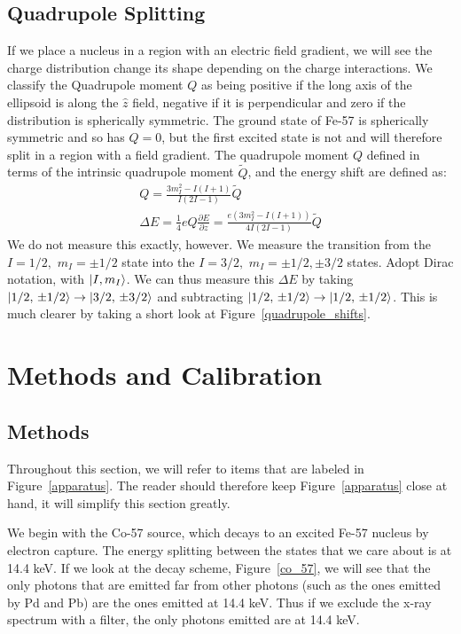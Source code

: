 \documentclass[reprint, nobibnotes, amssymb, amsmath, amsfonts, mathtools, mathrsfs, floatfix]{revtex4-1}
\begin{document}
      \subsection{Quadrupole Splitting}
        If we place a nucleus in a region with an electric field gradient, we will see the charge distribution change its shape depending on the charge interactions.  We classify the Quadrupole moment $Q$ as being positive if the long axis of the ellipsoid is along the $\hat{z}$ field, negative if it is perpendicular and zero if the distribution is spherically symmetric.  The ground state of Fe-57 is spherically symmetric and so has $Q = 0$, but the first excited state is not and will therefore split in a region with a field gradient.  The quadrupole moment $Q$ defined in terms of the intrinsic quadrupole moment $\tilde{Q}$, and the energy shift are defined as:
        \begin{gather}
          Q = \frac{3 m_I^2 - I(I+1)}{I(2I-1)}\tilde{Q} \label{quadrupole_moment} \\
          \Delta E = \frac{1}{4}eQ\frac{\partial E}{\partial z} = \frac{e\left(3 m_I^2 - I(I+1)\right)}{4I(2I-1)}\tilde{Q} \label{quadrupole_shift}
        \end{gather}
        We do not measure this exactly, however.  We measure the transition from the $I = 1/2,\,\, m_I = \pm1/2$ state into the $I = 3/2,\,\, m_I = \pm1/2, \pm3/2$ states.  Adopt Dirac notation, with $\ket{I, m_I}$.  We can thus measure this $\Delta E$ by taking $\ket{1/2,\,\pm1/2} \rightarrow \ket{3/2,\,\pm3/2}$ and subtracting $\ket{1/2,\,\pm1/2} \rightarrow \ket{1/2,\,\pm1/2}$.  This is much clearer by taking a short look at Figure~\ref{quadrupole_shifts}.

  \section{Methods and Calibration}
    \subsection{Methods}
      Throughout this section, we will refer to items that are labeled in Figure~\ref{apparatus}.  The reader should therefore keep Figure~\ref{apparatus} close at hand, it will simplify this section greatly.

      We begin with the Co-57 source, which decays to an excited Fe-57 nucleus by electron capture.  The energy splitting between the states that we care about is at 14.4 keV.  If we look at the decay scheme, Figure~\ref{co_57}, we will see that the only photons that are emitted far from other photons (such as the ones emitted by Pd and Pb) are the ones emitted at 14.4 keV.  Thus if we exclude the x-ray spectrum with a filter, the only photons emitted are at 14.4 keV.
\end{document}
